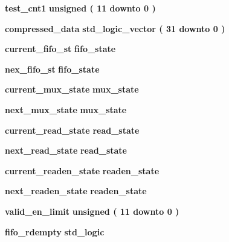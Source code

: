\begin{DoxyCompactItemize}
\item 
{\bf test\+\_\+cnt1} {\bfseries \textcolor{comment}{unsigned}\textcolor{vhdlchar}{ }\textcolor{vhdlchar}{(}\textcolor{vhdlchar}{ }\textcolor{vhdlchar}{ } \textcolor{vhdldigit}{11} \textcolor{vhdlchar}{ }\textcolor{keywordflow}{downto}\textcolor{vhdlchar}{ }\textcolor{vhdlchar}{ } \textcolor{vhdldigit}{0} \textcolor{vhdlchar}{ }\textcolor{vhdlchar}{)}\textcolor{vhdlchar}{ }} 
\item 
{\bf compressed\+\_\+data} {\bfseries \textcolor{comment}{std\+\_\+logic\+\_\+vector}\textcolor{vhdlchar}{ }\textcolor{vhdlchar}{(}\textcolor{vhdlchar}{ }\textcolor{vhdlchar}{ } \textcolor{vhdldigit}{31} \textcolor{vhdlchar}{ }\textcolor{keywordflow}{downto}\textcolor{vhdlchar}{ }\textcolor{vhdlchar}{ } \textcolor{vhdldigit}{0} \textcolor{vhdlchar}{ }\textcolor{vhdlchar}{)}\textcolor{vhdlchar}{ }} 
\item 
{\bf current\+\_\+fifo\+\_\+st} {\bfseries {\bfseries {\bf fifo\+\_\+state}} \textcolor{vhdlchar}{ }} 
\item 
{\bf nex\+\_\+fifo\+\_\+st} {\bfseries {\bfseries {\bf fifo\+\_\+state}} \textcolor{vhdlchar}{ }} 
\item 
{\bf current\+\_\+mux\+\_\+state} {\bfseries {\bfseries {\bf mux\+\_\+state}} \textcolor{vhdlchar}{ }} 
\item 
{\bf next\+\_\+mux\+\_\+state} {\bfseries {\bfseries {\bf mux\+\_\+state}} \textcolor{vhdlchar}{ }} 
\item 
{\bf current\+\_\+read\+\_\+state} {\bfseries {\bfseries {\bf read\+\_\+state}} \textcolor{vhdlchar}{ }} 
\item 
{\bf next\+\_\+read\+\_\+state} {\bfseries {\bfseries {\bf read\+\_\+state}} \textcolor{vhdlchar}{ }} 
\item 
{\bf current\+\_\+readen\+\_\+state} {\bfseries {\bfseries {\bf readen\+\_\+state}} \textcolor{vhdlchar}{ }} 
\item 
{\bf next\+\_\+readen\+\_\+state} {\bfseries {\bfseries {\bf readen\+\_\+state}} \textcolor{vhdlchar}{ }} 
\item 
{\bf valid\+\_\+en\+\_\+limit} {\bfseries \textcolor{comment}{unsigned}\textcolor{vhdlchar}{ }\textcolor{vhdlchar}{(}\textcolor{vhdlchar}{ }\textcolor{vhdlchar}{ } \textcolor{vhdldigit}{11} \textcolor{vhdlchar}{ }\textcolor{keywordflow}{downto}\textcolor{vhdlchar}{ }\textcolor{vhdlchar}{ } \textcolor{vhdldigit}{0} \textcolor{vhdlchar}{ }\textcolor{vhdlchar}{)}\textcolor{vhdlchar}{ }} 
\item 
{\bf fifo\+\_\+rdempty} {\bfseries \textcolor{comment}{std\+\_\+logic}\textcolor{vhdlchar}{ }} 

\end{DoxyCompactItemize}
